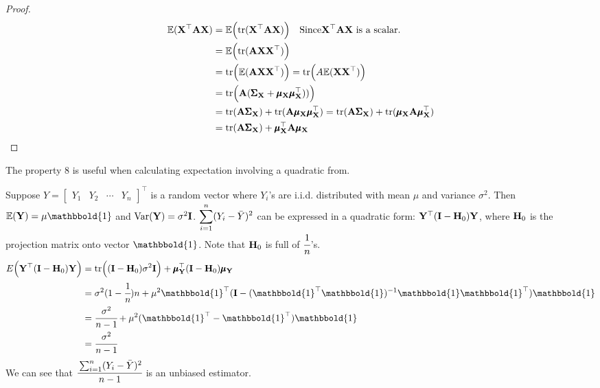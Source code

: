 \begin{Thm}
\begin{enumerate}
\begin{proof}
            \begin{align*}
                \mathbb{E}(\mathbf{X}^{\top}\mathbf{A}\mathbf{X}) &= \mathbb{E}\Big(  \text{tr}(\mathbf{X}^{\top}\mathbf{A}\mathbf{X}) \Big) \quad \text{Since} \mathbf{X}^{\top}\mathbf{A}\mathbf{X} \text{ is a scalar.}\\
                & = \mathbb{E}\Big(  \text{tr}(\mathbf{A}\mathbf{X}\mathbf{X}^{\top}) \Big)\\
                & = \text{tr}\Big( \mathbb{E}(\mathbf{A}\mathbf{X}\mathbf{X}^{\top}) \Big) = \text{tr}\Big(A\mathbb{E}(\mathbf{X}\mathbf{X}^{\top}) \Big) \\
                & = \text{tr}\Big(\mathbf{A}(\pmb{\Sigma}_{\mathbf{X}} + \pmb{\mu}_{\mathbf{X}}\pmb{\mu}_{\mathbf{X}}^{\top})) \Big)\\
                & = \text{tr}(\mathbf{A}\pmb{\Sigma}_{\mathbf{X}}) + \text{tr}(\mathbf{A}\pmb{\mu}_{\mathbf{X}}\pmb{\mu}_{\mathbf{X}}^{\top}) = \text{tr}(\mathbf{A}\pmb{\Sigma}_{\mathbf{X}}) + \text{tr}(\pmb{\mu}_{\mathbf{X}}\mathbf{A}\pmb{\mu}_{\mathbf{X}}^{\top})\\
                & = \text{tr}(\mathbf{A}\pmb{\Sigma}_{\mathbf{X}}) + \pmb{\mu}_{\mathbf{X}}^{\top}\mathbf{A}\pmb{\mu}_{\mathbf{X}}
            \end{align*}
        \end{proof}
    \end{enumerate}
    \end{Thm}
    
    The property 8 is useful  when calculating expectation involving a quadratic from.
    \begin{Ex}
        Suppose $Y = \begin{bmatrix}
            Y_1 & Y_2 & \cdots & Y_n
        \end{bmatrix}^{\top}$ is a random vector where $Y_i$'s are i.i.d. distributed with mean $\mu$ and variance $\sigma^2$. Then $\E(\B{Y}) = \mu \mathbbold{1}$ and $\text{Var}(\mathbf{Y}) = \sigma^2\mathbf{I}$. 
        $\displaystyle \sum_{i = 1}^n(Y_i - \Bar{Y})^2$ can be expressed in a quadratic form: $\mathbf{Y}^{\top}(\mathbf{I} - \mathbf{H}_0)\mathbf{Y}$, where $\mathbf{H}_0$ is the projection matrix onto vector $\mathbbold{1}$. Note that $\mathbf{H}_0$ is full of $\cfrac{1}{n}$'s.
        \begin{align*}
            E\Big( \T{\B{Y}}(\B{I} - \B{H}_0)\B{Y} \Big) &= \tr\Big( (\B{I} - \B{H}_0) \sigma^2 \B{I} \Big) + \muX{Y}^{\top} (\B{I} - \B{H}_0)\muX{Y}\\
            & = \sigma^2 (1 - \cfrac{1}{n}) n + \mu^2 \T{\mathbbold{1}}(\B{I} - (\T{\mathbbold{1}}\mathbbold{1})^{-1}\mathbbold{1}\T{\mathbbold{1}})\mathbbold{1}\\
            & = \cfrac{\sigma^2}{n - 1} + \mu^2 (\T{\mathbbold{1}} - \T{\mathbbold{1}})\mathbbold{1}\\
            & =  \cfrac{\sigma^2}{n - 1}
        \end{align*}
        We can see that $\cfrac{\sum_{i = 1}^n(Y_i - \Bar{Y})^2}{n - 1}$ is an unbiased estimator.
    \end{Ex}
    

